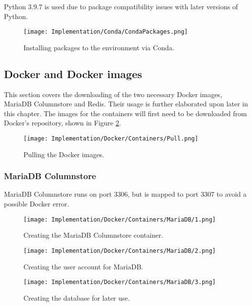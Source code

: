 \para Python 3.9.7 is used due to package compatibility issues with later versions of Python.

\begin{figure}[H]
    \centering
    \texttt{[image: Implementation/Conda/CondaPackages.png]}
    \caption{Installing packages to the environment via Conda.}
    \label{fig:CondaPackages}
\end{figure}

\subsection{Docker and Docker images}
This section covers the downloading of the two necessary Docker images, MariaDB Columnstore and Redis. 
Their usage is further elaborated upon later in this chapter. The images for the containers will first need to be
downloaded from Docker's repository, shown in Figure \ref{fig:DockerPull}.

\begin{figure}[H]
    \centering
    \texttt{[image: Implementation/Docker/Containers/Pull.png]}
    \caption{Pulling the Docker images.}
    \label{fig:DockerPull}
\end{figure}

\pagebreak 
\subsubsection{MariaDB Columnstore}
MariaDB Columnstore runs on port 3306, but is mapped to port 3307 to avoid a possible Docker error.

\begin{figure}[H]
    \centering
    \texttt{[image: Implementation/Docker/Containers/MariaDB/1.png]}
    \caption{Creating the MariaDB Columnstore container.}
    \label{fig:CreateMCS}
\end{figure}

\begin{figure}[H]
    \centering
    \texttt{[image: Implementation/Docker/Containers/MariaDB/2.png]}
    \caption{Creating the user account for MariaDB.}
    \label{fig:CreateMCSUser}
\end{figure}

\begin{figure}[H]
    \centering
    \texttt{[image: Implementation/Docker/Containers/MariaDB/3.png]}
    \caption{Creating the database for later use.}
    \label{fig:CreateDB}
\end{figure}

